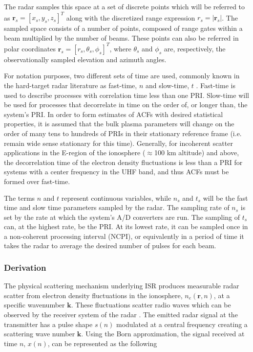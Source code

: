 The radar samples this space at a set of discrete points which will be referred to as $\mathbf{r}_s = [x_s,y_s,z_s]^T$ along with the discretized range expression $r_s=|\mathbf{r}_s|$. The sampled space consists of a number of points, composed of range gates within a beam multiplied by the number of beams. These points can also be referred in polar coordinates $\mathbf{r}_s = [r_s,\theta_s,\phi_s]^T$, where $\theta_s$  and $\phi_s$ are, respectively, the observationally sampled elevation and azimuth angles.

For notation purposes, two different sets of time are used, commonly known in the hard-target radar literature as fast-time, $n$ and slow-time, $t$ \citep{richards:fundamentalsigproc}. Fast-time is used to describe processes with correlation time less than one PRI. Slow-time will be used for processes that decorrelate in time on the order of, or longer than, the system's PRI. In order to form estimates of ACFs with desired statistical properties, it is assumed that the bulk plasma parameters will change on the order of many tens to hundreds of PRIs in their stationary reference frame (i.e. remain wide sense stationary for this time). Generally, for incoherent scatter applications in the E-region of the ionosphere ($\approx$100 km altitude) and above, the decorrelation time of the electron density fluctuations is less than a PRI for systems with a center frequency in the UHF band, and thus ACFs must be formed over fast-time.

The terms $n$ and $t$ represent continuous variables, while $n_s$ and $t_s$ will be the fast time and slow time parameters sampled by the radar. The sampling rate of $n_s$ is set by the rate at which the system's A/D converters are run. The sampling of $t_s$ can, at the highest rate, be the PRI. At its lowest rate, it can be sampled once in a non-coherent processing interval (NCPI), or equivalently in a period of time it takes the radar to average the desired number of pulses for each beam. 

\subsubsection{Derivation}

The physical scattering mechanism underlying ISR produces measurable radar scatter from electron density fluctuations in the ionosphere, $n_e(\mathbf{r},n)$, at a specific wavenumber $\mathbf{k}$. These fluctuations scatter radio waves which can be observed by the receiver system of the radar \citep{dougherty:farley1960}. The emitted radar signal at the transmitter has a pulse shape $s(n)$ modulated at a central frequency creating a scattering wave number $\mathbf{k}$. Using the Born approximation, the signal received at time $n$, $x(n)$, can be represented as the following

